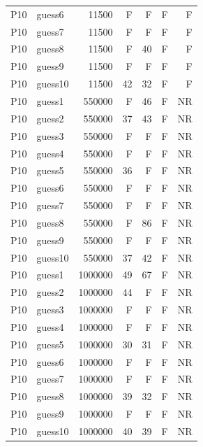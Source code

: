 {\begin{longtable}{llrrrrr}
P10 & guess6 & 11500 & F & F & F & F \\
P10 & guess7 & 11500 & F & F & F & F \\
P10 & guess8 & 11500 & F & 40 & F & F \\
P10 & guess9 & 11500 & F & F & F & F \\
P10 & guess10 & 11500 & 42 & 32 & F & F \\
P10 & guess1 & 550000 & F & 46 & F & NR \\
P10 & guess2 & 550000 & 37 & 43 & F & NR \\
P10 & guess3 & 550000 & F & F & F & NR \\
P10 & guess4 & 550000 & F & F & F & NR \\
P10 & guess5 & 550000 & 36 & F & F & NR \\
P10 & guess6 & 550000 & F & F & F & NR \\
P10 & guess7 & 550000 & F & F & F & NR \\
P10 & guess8 & 550000 & F & 86 & F & NR \\
P10 & guess9 & 550000 & F & F & F & NR \\
P10 & guess10 & 550000 & 37 & 42 & F & NR \\
P10 & guess1 & 1000000 & 49 & 67 & F & NR \\
P10 & guess2 & 1000000 & 44 & F & F & NR \\
P10 & guess3 & 1000000 & F & F & F & NR \\
P10 & guess4 & 1000000 & F & F & F & NR \\
P10 & guess5 & 1000000 & 30 & 31 & F & NR \\
P10 & guess6 & 1000000 & F & F & F & NR \\
P10 & guess7 & 1000000 & F & F & F & NR \\
P10 & guess8 & 1000000 & 39 & 32 & F & NR \\
P10 & guess9 & 1000000 & F & F & F & NR \\
P10 & guess10 & 1000000 & 40 & 39 & F & NR \\
\end{longtable}}

